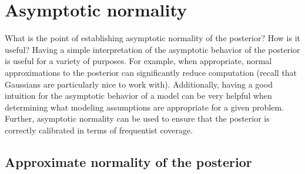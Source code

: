 \documentclass[12pt]{article}
\begin{document}
\section{Asymptotic normality}

What is the point of establishing asymptotic normality of the posterior? How is it useful? Having a simple interpretation of the asymptotic behavior of the posterior is useful for a variety of purposes. For example, when appropriate, normal approximations to the posterior can significantly reduce computation (recall that Gaussians are particularly nice to work with). Additionally, having a good intuition for the asymptotic behavior of a model can be very helpful when determining what modeling assumptions are appropriate for a given problem. Further, asymptotic normality can be used to ensure that the posterior is correctly calibrated in terms of frequentist coverage. 

\subsection{Approximate normality of the posterior}
\end{document}

